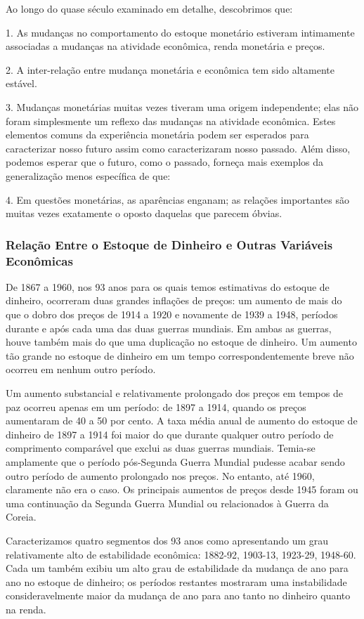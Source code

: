 \documentclass[a4paper,12pt]{article}[abntex2]
\begin{document}
Ao longo do quase século examinado em detalhe, descobrimos que:

1. As mudanças no comportamento do estoque monetário estiveram intimamente associadas a mudanças na atividade econômica, renda monetária e preços.

2. A inter-relação entre mudança monetária e econômica tem sido altamente estável.

3. Mudanças monetárias muitas vezes tiveram uma origem independente; elas não foram simplesmente um reflexo das mudanças na atividade econômica.
Estes elementos comuns da experiência monetária podem ser esperados para caracterizar nosso futuro assim como caracterizaram nosso passado. Além disso, podemos esperar que o futuro, como o passado, forneça mais exemplos da generalização menos específica de que:

4. Em questões monetárias, as aparências enganam; as relações importantes são muitas vezes exatamente o oposto daquelas que parecem óbvias.

\subsubsection{\textbf{Relação Entre o Estoque de Dinheiro e Outras Variáveis Econômicas}}

De 1867 a 1960, nos 93 anos para os quais temos estimativas do estoque de dinheiro, ocorreram duas grandes inflações de preços: um aumento de mais do que o dobro dos preços de 1914 a 1920 e novamente de 1939 a 1948, períodos durante e após cada uma das duas guerras mundiais. Em ambas as guerras, houve também mais do que uma duplicação no estoque de dinheiro. Um aumento tão grande no estoque de dinheiro em um tempo correspondentemente breve não ocorreu em nenhum outro período.

Um aumento substancial e relativamente prolongado dos preços em tempos de paz ocorreu apenas em um período: de 1897 a 1914, quando os preços aumentaram de 40 a 50 por cento. A taxa média anual de aumento do estoque de dinheiro de 1897 a 1914 foi maior do que durante qualquer outro período de comprimento comparável que exclui as duas guerras mundiais. Temia-se amplamente que o período pós-Segunda Guerra Mundial pudesse acabar sendo outro período de aumento prolongado nos preços. No entanto, até 1960, claramente não era o caso. Os principais aumentos de preços desde 1945 foram ou uma continuação da Segunda Guerra Mundial ou relacionados à Guerra da Coreia.

Caracterizamos quatro segmentos dos 93 anos como apresentando um grau relativamente alto de estabilidade econômica: 1882-92, 1903-13, 1923-29, 1948-60. Cada um também exibiu um alto grau de estabilidade da mudança de ano para ano no estoque de dinheiro; os períodos restantes mostraram uma instabilidade consideravelmente maior da mudança de ano para ano tanto no dinheiro quanto na renda.
\end{document}
